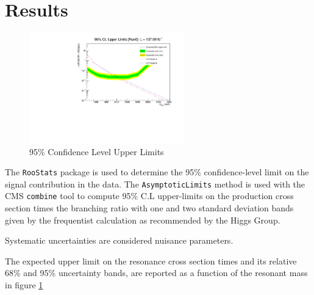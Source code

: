 \section{Results}

\begin{figure}[tph]
  \centering
  \includegraphics[width=0.6\textwidth]{fig/Run2/Run2_ExclusionLimits.pdf}
  \caption{95\% Confidence Level Upper Limits}
  \label{fig:BrazilianPlot}
\end{figure}

The \verb|RooStats| package is used to determine the 95\% confidence-level limit
on the signal contribution in the data. The \verb|AsymptoticLimits| method is
used with the CMS \verb|combine| tool to compute 95\% C.L upper-limits on the
production cross section times the branching ratio with one and two standard
deviation bands given by the frequentist calculation as recommended by the
Higgs Group.

Systematic uncertainties are considered nuisance parameters.

The expected upper limit on the resonance cross section times and its relative
68\% and 95\% uncertainty bands, are reported as a function of the resonant mass
in figure \ref{fig:BrazilianPlot}


